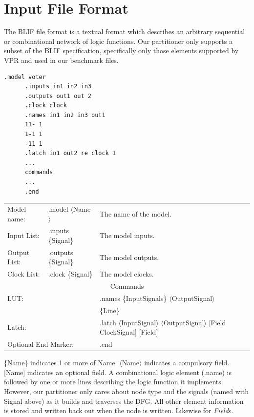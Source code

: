 \documentclass[12pt,final,oneside]{dwThesis} %
\begin{document}
   \section{Input File Format}
   \label{secBlif} The \gls{BLIF} file format is a
   textual format which describes an arbitrary sequential or combinational
   network of logic functions\cite{BLIF}.  Our partitioner only supports a
   subset of the \gls{BLIF} specification, specifically only those elements
   supported by \gls{VPR} and used in our benchmark files.

   \begin{lstlisting}[caption=BLIF file layout, label=SampleBlif]
   .model voter
      .inputs in1 in2 in3
      .outputs out1 out 2
      .clock clock
      .names in1 in2 in3 out1
      11- 1
      1-1 1
      -11 1
      .latch in1 out2 re clock 1
      ...  
      commands 
      ...  
      .end
   \end{lstlisting}




   \begin{tabular}
      {lll} Model name: & .model $\langle$Name$\rangle$ & The name
      of the model.\\
      Input List: & .inputs \{Signal\} & The model inputs.\\

      Output List:& .outputs \{Signal\} & The model outputs.\\
      Clock List: &
      .clock \{Signal\} & The model clocks.\\
      \multicolumn{3}{c}{Commands}\\

      \multicolumn{2}{l}{\gls{LUT}:} & .names \{InputSignals\}
      $\langle$OutputSignal$\rangle$\\
      &&\{Line\}\\
      \multicolumn{2}{l}{Latch:}
      & .latch $\langle$InputSignal$\rangle$ $\langle$OutputSignal$\rangle$
      [Field ClockSignal] [Field]\\
      \multicolumn{2}{l}{Optional End Marker:} &
      .end 
   \end{tabular}


   \{Name\} indicates 1 or more of Name. $\langle$Name$\rangle$ indicates a
   compulsory field. [Name] indicates an optional field.  A combinational logic
   element (.name) is followed by one or more lines describing the logic
   function it implements. However, our partitioner only cares about node type
   and the signals (named with Signal above) as it builds and traverses the
   \gls{DFG}. All other element information is stored and written back out when
   the node is written. Likewise for \textit{Field}s.
\end{document}
